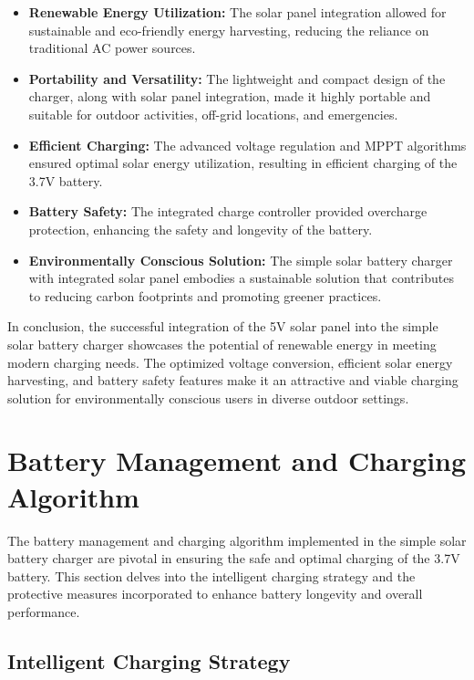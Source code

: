 \documentclass[twocolumn]{article}
\begin{document}
\begin{itemize}
  \item \textbf{Renewable Energy Utilization:} The solar panel integration allowed for sustainable and eco-friendly energy harvesting, reducing the reliance on traditional AC power sources.

  \item \textbf{Portability and Versatility:} The lightweight and compact design of the charger, along with solar panel integration, made it highly portable and suitable for outdoor activities, off-grid locations, and emergencies.

  \item \textbf{Efficient Charging:} The advanced voltage regulation and MPPT algorithms ensured optimal solar energy utilization, resulting in efficient charging of the 3.7V battery.

  \item \textbf{Battery Safety:} The integrated charge controller provided overcharge protection, enhancing the safety and longevity of the battery.

  \item \textbf{Environmentally Conscious Solution:} The simple solar battery charger with integrated solar panel embodies a sustainable solution that contributes to reducing carbon footprints and promoting greener practices.

\end{itemize}

\noindent In conclusion, the successful integration of the 5V solar panel into the simple solar battery charger showcases the potential of renewable energy in meeting modern charging needs. The optimized voltage conversion, efficient solar energy harvesting, and battery safety features make it an attractive and viable charging solution for environmentally conscious users in diverse outdoor settings.

\section*{Battery Management and Charging Algorithm}

The battery management and charging algorithm implemented in the simple solar battery charger are pivotal in ensuring the safe and optimal charging of the 3.7V battery. This section delves into the intelligent charging strategy and the protective measures incorporated to enhance battery longevity and overall performance.

\subsection*{Intelligent Charging Strategy}
\end{document}
